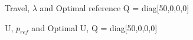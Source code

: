 \documentclass[11pt, a4paper, USenglish]{article} %
\newlength{\figureheight}
\newlength{\figurewidth}
\begin{document}
\begin{figure}[H] 
        \centering
        \setlength{\figureheight}{6cm}
        \setlength{\figurewidth}{10cm}
        
        \caption{Travel, \(\lambda\) and Optimal reference Q = diag[50,0,0,0]} 
\label{fig:ex3_travel} 
\end{figure}    

\begin{figure}[H] 
        \centering
        \setlength{\figureheight}{6cm}
        \setlength{\figurewidth}{10cm}
        
        \caption{U, \(p_{ref}\) and Optimal U, Q = diag[50,0,0,0]} 
\label{fig:ex3_u} 
\end{figure} 
\end{document}
